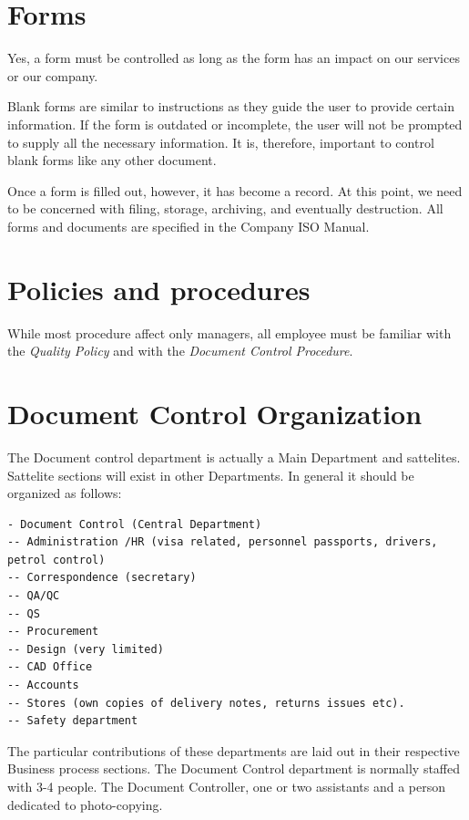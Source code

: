 \section*{Forms}

Yes, a form must be controlled as long as the form has an impact on our services or our company.

Blank forms are similar to instructions as they guide the user to provide certain information. If the form is outdated or incomplete, the user will not be prompted to supply all the necessary information. It is, therefore, important to control blank forms like any other document.

Once a form is filled out, however, it has become a record. At this point, we need to be concerned with filing, storage, archiving, and eventually destruction.
All forms and documents are specified in the Company ISO Manual.

\section*{Policies and procedures}

While most procedure affect only managers, all employee must be familiar with the \textit{Quality Policy} and with the \textit{Document Control Procedure}.

\section*{Document Control Organization}

The Document control department is actually a Main Department and sattelites. Sattelite sections will exist in other Departments. In general it should be organized as follows:

\begin{verbatim}
- Document Control (Central Department)
-- Administration /HR (visa related, personnel passports, drivers, petrol control)
-- Correspondence (secretary)
-- QA/QC
-- QS
-- Procurement
-- Design (very limited)
-- CAD Office
-- Accounts
-- Stores (own copies of delivery notes, returns issues etc).
-- Safety department
\end{verbatim}

The particular contributions of these departments are laid out in their respective Business process sections. The Document Control department is normally staffed with 3-4 people. The Document Controller, one or two assistants and a person dedicated to photo-copying. 


